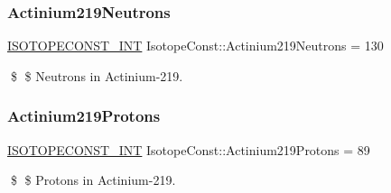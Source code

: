 \subsubsection{\texorpdfstring{Actinium219\+Neutrons}{Actinium219Neutrons}}
{\footnotesize\ttfamily \mbox{\hyperlink{group___isotope_const-_macros_ga5f18360b3e99483a35c32d789e62621c}{I\+S\+O\+T\+O\+P\+E\+C\+O\+N\+S\+T\+\_\+\+I\+NT}} Isotope\+Const\+::\+Actinium219\+Neutrons = 130}

\$ \$ Neutrons in Actinium-\/219. \mbox{\label{group___isotope_const-_actinium-_ac219_ga2b8384a498e8e1e5238c4e22e69836e5}} 
\subsubsection{\texorpdfstring{Actinium219\+Protons}{Actinium219Protons}}
{\footnotesize\ttfamily \mbox{\hyperlink{group___isotope_const-_macros_ga5f18360b3e99483a35c32d789e62621c}{I\+S\+O\+T\+O\+P\+E\+C\+O\+N\+S\+T\+\_\+\+I\+NT}} Isotope\+Const\+::\+Actinium219\+Protons = 89}

\$ \$ Protons in Actinium-\/219. 